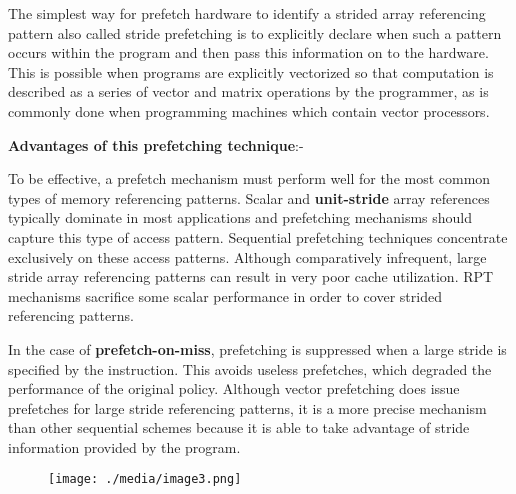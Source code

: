 \documentclass[12pt]{article}
\begin{document}
\vspace{\baselineskip}
{\fontsize{15pt}{18.0pt}\selectfont The simplest way for prefetch hardware to identify a strided array referencing pattern also called stride prefetching is to explicitly declare when such a pattern occurs within the program and then pass this information on to the hardware. This is possible when programs are explicitly vectorized so that computation is described as a series of vector and matrix operations by the programmer, as is commonly done when programming machines which contain vector processors.\par}\par


\vspace{\baselineskip}
{\fontsize{15pt}{18.0pt}\selectfont \textbf{Advantages of this prefetching technique}:-\par}\par

{\fontsize{15pt}{18.0pt}\selectfont To be effective, a prefetch mechanism must perform well for the most common types of memory referencing patterns. Scalar and\textbf{ unit-stride }array references typically dominate in most applications and prefetching mechanisms should capture this type of access pattern. Sequential prefetching techniques concentrate exclusively on these access patterns. Although comparatively infrequent, large stride array referencing patterns can result in very poor cache utilization. RPT mechanisms sacrifice some scalar performance in order to cover strided referencing patterns. \par}\par

{\fontsize{15pt}{18.0pt}\selectfont In the case of \textbf{prefetch-on-miss}, prefetching is suppressed when a large stride is specified by the instruction. This avoids useless prefetches, which degraded the performance of the original policy. Although vector prefetching does issue prefetches for large stride referencing patterns, it is a more precise mechanism than other sequential schemes because it is able to take advantage of stride information provided by the program.\par}\par




\begin{figure}[H]
	\begin{Center}
		\texttt{[image: ./media/image3.png]}
	\end{Center}
\end{figure}
\end{document}

